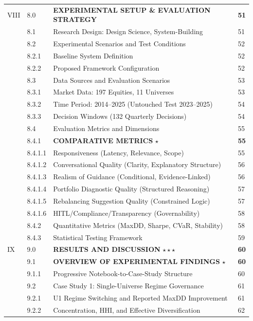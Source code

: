 \documentclass[11pt]{article}
\begin{document}
\begin{longtable}{C{0.8cm}C{1.2cm}L{9.7cm}C{1.2cm}}
VIII & 8.0 & \textbf{EXPERIMENTAL SETUP \& EVALUATION STRATEGY} & \textbf{51} \\
 & 8.1 & Research Design: Design Science, System-Building & 51 \\
 & 8.2 & Experimental Scenarios and Test Conditions & 52 \\
 & 8.2.1 & Baseline System Definition & 52 \\
 & 8.2.2 & Proposed Framework Configuration & 52 \\
 & 8.3 & Data Sources and Evaluation Scenarios & 53 \\
 & 8.3.1 & Market Data: 197 Equities, 11 Universes & 53 \\
 & 8.3.2 & Time Period: 2014--2025 (Untouched Test 2023--2025) & 54 \\
 & 8.3.3 & Decision Windows (132 Quarterly Decisions) & 54 \\
 & 8.4 & Evaluation Metrics and Dimensions & 55 \\
 & 8.4.1 & \textbf{COMPARATIVE METRICS} $\star$ & \textbf{55} \\
 & 8.4.1.1 & Responsiveness (Latency, Relevance, Scope) & 55 \\
 & 8.4.1.2 & Conversational Quality (Clarity, Explanatory Structure) & 56 \\
 & 8.4.1.3 & Realism of Guidance (Conditional, Evidence-Linked) & 56 \\
 & 8.4.1.4 & Portfolio Diagnostic Quality (Structured Reasoning) & 57 \\
 & 8.4.1.5 & Rebalancing Suggestion Quality (Constrained Logic) & 57 \\
 & 8.4.1.6 & HITL/Compliance/Transparency (Governability) & 58 \\
 & 8.4.2 & Quantitative Metrics (MaxDD, Sharpe, CVaR, Stability) & 58 \\
 & 8.4.3 & Statistical Testing Framework & 59 \\
IX & 9.0 & \textbf{RESULTS AND DISCUSSION} $\star\star\star$ & \textbf{60} \\
 & 9.1 & \textbf{OVERVIEW OF EXPERIMENTAL FINDINGS} $\star$ & \textbf{60} \\
 & 9.1.1 & Progressive Notebook-to-Case-Study Structure & 60 \\
 & 9.2 & Case Study 1: Single-Universe Regime Governance & 61 \\
 & 9.2.1 & U1 Regime Switching and Reported MaxDD Improvement & 61 \\
 & 9.2.2 & Concentration, HHI, and Effective Diversification & 62 \\

\end{longtable}
\end{document}
